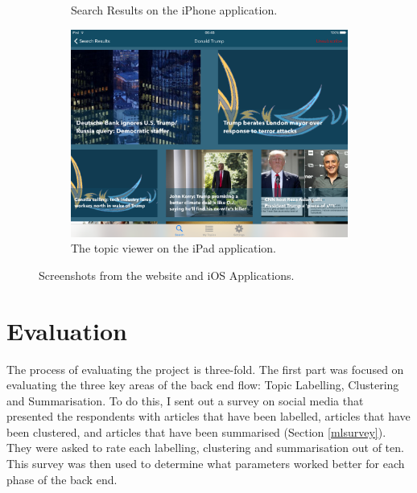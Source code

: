 \documentclass[12pt]{article}
\begin{document}
\begin{figure}[ht!]
\begin{subfigure}[t]{0.3\textwidth}
   \caption{Search Results on the iPhone application.}
   \end{subfigure}
   \qquad
    \begin{subfigure}[t]{0.6\textwidth}
    \includegraphics[width=\textwidth]{iPadScreenshot.PNG}
   \caption{The topic viewer on the iPad application.}
   \end{subfigure}
   \caption[Screenshots from the website and iOS Applications]{Screenshots from the website and iOS Applications.}
   \label{appscreenshots}
\end{figure}


\clearpage

\section{Evaluation}

The process of evaluating the project is three-fold. The first part was focused on evaluating the three key areas of the back end flow: Topic Labelling, Clustering and Summarisation. To do this, I sent out a survey on social media that presented the respondents with articles that have been labelled, articles that have been clustered, and articles that have been summarised (Section \ref{mlsurvey}). They were asked to rate each labelling, clustering and summarisation out of ten. This survey was then used to determine what parameters worked better for each phase of the back end. 
\end{document}
